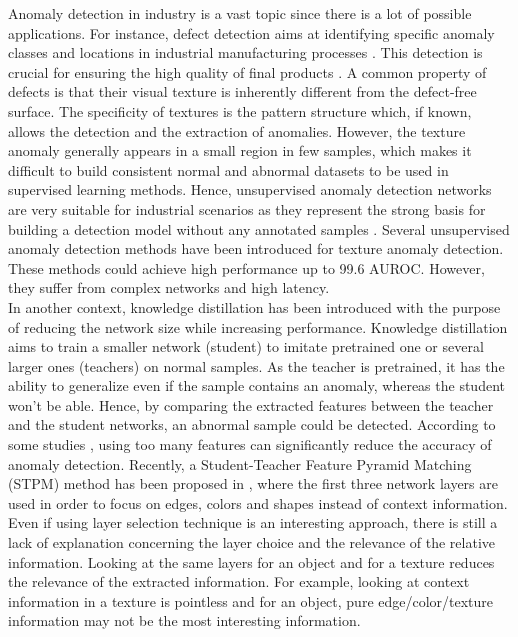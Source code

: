 \documentclass[a4paper,twoside]{article}
\begin{document}
Anomaly detection in industry is a vast topic since there is a lot of possible applications. For instance, defect detection aims at identifying specific anomaly classes and locations in industrial manufacturing processes \citep{kahler_anomaly_2022}. This detection is crucial for ensuring the high quality of final products \citep{minhas_anonet_2019}. A common property of defects is that their visual texture is inherently different from the defect-free surface. The specificity of textures is the pattern structure which, if known, allows the detection and the extraction of anomalies. However, the texture anomaly generally appears in a small region in few samples, which makes it difficult to build consistent normal and abnormal datasets to be used in supervised learning methods. Hence, unsupervised anomaly detection networks are very suitable for industrial scenarios as they represent the strong basis for building a detection model without any annotated samples \citep{huang_unsupervised_nodate}. Several unsupervised anomaly detection methods have been introduced for texture anomaly detection. These methods could achieve high performance up to 99.6 AUROC. However, they suffer from complex networks and high latency.\\ 

\noindent In another context, knowledge distillation has been introduced with the purpose of reducing the network size while increasing performance. Knowledge distillation aims to train a smaller network (student) to imitate pretrained one or several larger ones (teachers) on normal samples. As the teacher is pretrained, it has the ability to generalize even if the sample contains an anomaly, whereas the student won't be able. Hence, by comparing the extracted features between the teacher and the student networks, an abnormal sample could be detected. According to some studies \citep{iglesias_analysis_2015}, using too many features can significantly reduce the accuracy of anomaly detection. Recently, a Student-Teacher Feature Pyramid Matching (STPM) method has been proposed in \citep{wang_student-teacher_2021}, where the first three network layers are used in order to focus on edges, colors and shapes instead of context information. Even if using layer selection technique is an interesting approach, there is still a lack of explanation concerning the layer choice and the relevance of the relative information. Looking at the same layers for an object and for a texture reduces the relevance of the extracted information. For example, looking at context information in a texture is pointless and for an object, pure edge/color/texture information may not be the most interesting information.  
		
\end{document}
